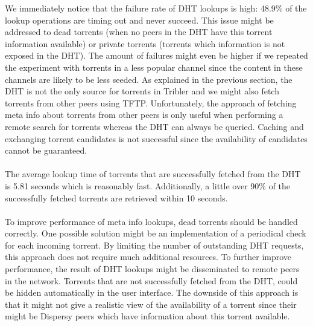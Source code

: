 \noindent We immediately notice that the failure rate of DHT lookups is high: 48.9\% of the lookup operations are timing out and never succeed. This issue might be addressed to dead torrents (when no peers in the DHT have this torrent information available) or private torrents (torrents which information is not exposed in the DHT). The amount of failures might even be higher if we repeated the experiment with torrents in a less popular channel since the content in these channels are likely to be less seeded. As explained in the previous section, the DHT is not the only source for torrents in Tribler and we might also fetch torrents from other peers using TFTP. Unfortunately, the approach of fetching meta info about torrents from other peers is only useful when performing a remote search for torrents whereas the DHT can always be queried. Caching and exchanging torrent candidates is not successful since the availability of candidates cannot be guaranteed.\\\\
The average lookup time of torrents that are successfully fetched from the DHT is 5.81 seconds which is reasonably fast. Additionally, a little over 90\% of the successfully fetched torrents are retrieved within 10 seconds.\\\\
To improve performance of meta info lookups, dead torrents should be handled correctly. One possible solution might be an implementation of a periodical check for each incoming torrent. By limiting the number of outstanding DHT requests, this approach does not require much additional resources. To further improve performance, the result of DHT lookups might be disseminated to remote peers in the network. Torrents that are not successfully fetched from the DHT, could be hidden automatically in the user interface. The downside of this approach is that it might not give a realistic view of the availability of a torrent since their might be Dispersy peers which have information about this torrent available.